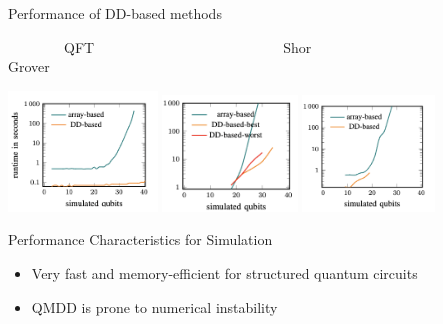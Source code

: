 \begin{refframe}{Performance of DD-based methods}
\centering

	~~~~~~~~QFT~~~~~~~~~~~~~~~~~~~~~~~~~~~Shor~~~~~~~~~~~~~~~~~~~~~~~~~~~~Grover\vspace{-1em}

	\includegraphics[height=3.2cm]{graphics/perf-qft}\hspace{-1em}
	\includegraphics[height=3.1cm]{graphics/perf-shor}\hspace{-1ex}	
	\includegraphics[height=3.1cm]{graphics/perf-grover}

\begin{alertblock}{Performance Characteristics for Simulation~\cite{grurl2020arrays}}
	\begin{itemize}
		\item<+-> Very fast and memory-efficient for structured quantum circuits
		\item<+-> QMDD is prone to numerical instability~\cite{niemann2020overcoming}
	\end{itemize}
\end{alertblock}

\vspace{-1em}

\end{refframe}













